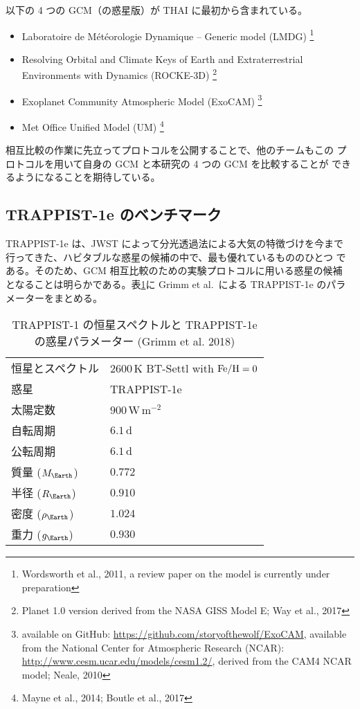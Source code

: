 \documentclass{dennou777}
\newcommand{\hmunit}[1]{\,\mathrm{#1}}
\begin{document}
以下の 4 つの GCM（の惑星版）が THAI に最初から含まれている。
\begin{itemize}
	\item Laboratoire de Météorologie Dynamique -- Generic model (LMDG)%
		\footnote{Wordsworth et al., 2011, a review paper on the model
		is currently under preparation}
	\item Resolving Orbital and Climate Keys of Earth and
		Extraterrestrial Environments with Dynamics (ROCKE-3D)%
		\footnote{Planet 1.0 version derived from the NASA GISS Model E;
		Way et al., 2017}
	\item Exoplanet Community Atmospheric Model (ExoCAM)
		\footnote{available on GitHub:
		\url{https://github.com/storyofthewolf/ExoCAM},
		available from the National Center for Atmospheric Research (NCAR):
		\url{http://www.cesm.ucar.edu/models/cesm1.2/},
		derived from the CAM4 NCAR model; Neale, 2010}
	\item Met Office Unified Model (UM)
		\footnote{Mayne et al., 2014; Boutle et al., 2017}
\end{itemize}

相互比較の作業に先立ってプロトコルを公開することで、他のチームもこの
プロトコルを用いて自身の GCM と本研究の 4 つの GCM を比較することが
できるようになることを期待している。

\subsection{TRAPPIST-1e のベンチマーク}\label{benchmark}

TRAPPIST-1e は、JWST によって分光透過法による大気の特徴づけを今まで
行ってきた、ハビタブルな惑星の候補の中で、最も優れているもののひとつ
である。そのため、GCM 相互比較のための実験プロトコルに用いる惑星の候補
となることは明らかである。表\ref{param}に Grimm et al.\ による TRAPPIST-1e
のパラメーターをまとめる。

\begin{table}[t]
	\caption{TRAPPIST-1 の恒星スペクトルと TRAPPIST-1e の惑星パラメーター
	(Grimm et al. 2018)}\label{param}
	\centering
	\begin{tabular}{ll}
		\hline
		恒星とスペクトル&\(2600\hmunit{K}\) BT-Settl with \(\ce{Fe/H}=0\)\\
		惑星&TRAPPIST-1e\\
		太陽定数&\(900\hmunit{W\,m^{-2}}\)\\
		自転周期&\(6.1\hmunit{d}\)\\
		公転周期&\(6.1\hmunit{d}\)\\
		質量 (\(M_\Earth\))&\(0.772\)\\
		半径 (\(R_\Earth\))&\(0.910\)\\
		密度 (\(\rho_\Earth\))&\(1.024\)\\
		重力 (\(g_\Earth\))&\(0.930\)\\
		\hline
	\end{tabular}
\end{table}
\end{document}
